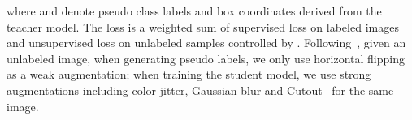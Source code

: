 \documentclass[letterpaper]{article} \usepackage{aaai22}  \usepackage{times}  \usepackage{helvet}  \usepackage{courier}  \usepackage[hyphens]{url}  \usepackage{graphicx} \urlstyle{rm} \def\UrlFont{\rm}  \usepackage{natbib}  \usepackage{caption} \DeclareCaptionStyle{ruled}{labelfont=normalfont,labelsep=colon,strut=off} \frenchspacing  \setlength{\pdfpagewidth}{8.5in}  \setlength{\pdfpageheight}{11in}  \usepackage{algorithm}
\begin{document}
where  and  denote pseudo class labels and box coordinates derived from the teacher model. The loss is a weighted sum of supervised loss  on labeled images and unsupervised loss  on unlabeled samples controlled by . Following~\cite{stac,unbiasedteacher,instantteaching,ismt}, given an unlabeled image, when generating pseudo labels, we only use horizontal flipping as a weak augmentation; when training the student model, we use strong augmentations including color jitter, Gaussian blur and Cutout~\citeyearpar{cutout} for the same image.

\begin{table*}[t]  \centering
{}
\hspace{4mm}
\end{table*}
\end{document}
